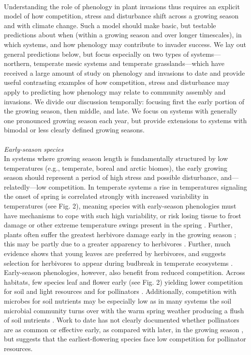 \documentclass[11pt,a4paper,oneside]{article}
\begin{document}
\\
Understanding the role of phenology in plant invasions thus requires an explicit model of how competition, stress and disturbance shift across a growing season and with climate change. Such a model should make basic, but testable predictions about when (within a growing season and over longer timescales), in which systems, and how phenology may contribute to invader success. We lay out general predictions below, but focus especially on two types of systems---northern, temperate mesic systems and temperate grasslands---which have received a large amount of study on phenology and invasions to date and provide useful contrasting examples of how competition, stress and disturbance may apply to predicting how phenology may relate to community assembly and invasions. We divide our discussion temporally: focusing first the early portion of the growing season, then middle, and late. We focus on systems with generally one pronounced growing season each year, but provide extensions to systems with bimodal or less clearly defined growing seasons.\\
\\
\noindent \emph{Early-season species}\\
In systems where growing season length is fundamentally structured by low temperatures (e.g., temperate, boreal and arctic biomes), the early growing season should represent a period of high stress and possible disturbance, and---relatedly---low competition. In temperate systems a rise in temperatures signaling the onset of spring is correlated strongly with increased variability in temperatures (see Fig. 2), meaning species with early-season phenologies must have mechanisms to cope with such high variability, or risk losing tissue to frost damage or other extreme temperature swings present in the spring \citep{Linkosalo2000,Augspurger:2009gj}. Further, plants often suffer the greatest herbivore damage early in the growing season \citep{Lechowicz:1984cr}; this may be partly due to a greater apparency to herbivores \citep{Brody:1997ro}. Further, much evidence shows that young leaves are preferred by herbivores, and suggests selection for herbivores to appear during budbreak in temperate ecosystems \citep{vanasch2007}. Early-season phenologies, however, also benefit from reduced competition. Across habitats, few species leaf and flower early (see Fig. 2) yielding lower competition for soil and light resources and for pollinators \citep{Mosquin1971}. Additionally, competition with microbes for soil nutrients may be especially low as in many systems the soil microbial community turns over with the warm spring weather producing a flush of soil nutrients \citep{Zak:1990ar}. Work to date has not clearly documented whether pollinators are as common or effective early, as compared with later, in the growing season \citep{Mosquin1971,filella2013}, but \citet{Mosquin1971} suggests that the earliest-flowering species face low competition for pollinator resources.\\
\end{document}
